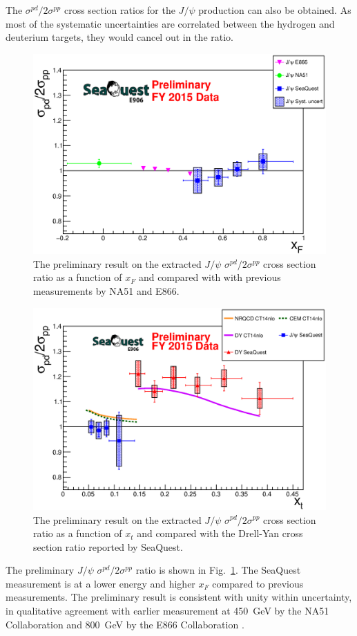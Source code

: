 \documentclass[10pt,a4paper,final]{article}
\begin{document}
The $\sigma^{pd}/2\sigma^{pp}$ cross section ratios for the $J/\psi$ production
can also be obtained. As most of the systematic uncertainties are correlated
between the hydrogen and deuterium targets, they would cancel out in the ratio.
\begin{figure}[h!]
	\centering
	\includegraphics[width=0.6\linewidth]{jPsi_all_noTheory_v2}
	\caption{The preliminary result on the extracted $J/\psi$ $\sigma^{pd}/2\sigma^{pp}$
		cross section ratio as a function of $x_F$ and compared with with previous 
		measurements by NA51 and E866.}
	\label{fig:csr}
\end{figure}
\begin{figure}[h!]
	\centering
	\includegraphics[width=0.6\linewidth]{jPsi_csr_x2_nature_NRQCD_CEM}
	\caption{The preliminary result on the extracted $J/\psi$ $\sigma^{pd}/2\sigma^{pp}$
		cross section ratio as a function of $x_t$ and compared with the Drell-Yan cross
		section ratio reported by SeaQuest.}
	\label{fig:csr_xT}
\end{figure}
The preliminary $J/\psi$ $\sigma^{pd}/2\sigma^{pp}$ ratio is shown in
Fig.~\ref{fig:csr}. The SeaQuest measurement is at a lower energy and higher $x_F$
compared to previous measurements. The preliminary result is consistent with unity
within uncertainty, in qualitative agreement with earlier measurement at \SI{450}{\GeV}
by the NA51 Collaboration \cite{abreu1998} and \SI{800}{\GeV} by the E866 Collaboration
\cite{peng2003}.
\end{document}
